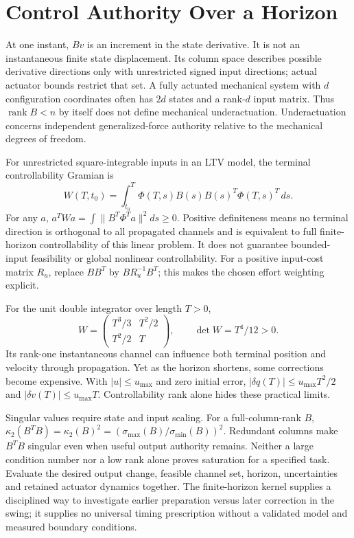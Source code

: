 \section{Control Authority Over a Horizon}

At one instant, $Bv$ is an increment in the state derivative. It is not an instantaneous finite state displacement. Its column space describes possible derivative directions only with unrestricted signed input directions; actual actuator bounds restrict that set. A fully actuated mechanical system with $d$ configuration coordinates often has $2d$ states and a rank-$d$ input matrix. Thus $\operatorname{rank}B<n$ by itself does not define mechanical underactuation. Underactuation concerns independent generalized-force authority relative to the mechanical degrees of freedom.

For unrestricted square-integrable inputs in an LTV model, the terminal controllability Gramian is
\begin{equation}
W(T,t_0)=\int_{t_0}^T\Phi(T,s)B(s)B(s)^T\Phi(T,s)^T\,ds.
\end{equation}
For any $a$, $a^TWa=\int\|B^T\Phi^Ta\|^2ds\ge0$. Positive definiteness means no terminal direction is orthogonal to all propagated channels and is equivalent to full finite-horizon controllability of this linear problem. It does not guarantee bounded-input feasibility or global nonlinear controllability. For a positive input-cost matrix $R_u$, replace $BB^T$ by $BR_u^{-1}B^T$; this makes the chosen effort weighting explicit.

For the unit double integrator over length $T>0$,
\begin{equation}
W=\begin{pmatrix}T^3/3&T^2/2\\T^2/2&T\end{pmatrix},
\qquad \det W=T^4/12>0.
\end{equation}
Its rank-one instantaneous channel can influence both terminal position and velocity through propagation. Yet as the horizon shortens, some corrections become expensive. With $|u|\le u_{\max}$ and zero initial error, $|\delta q(T)|\le u_{\max}T^2/2$ and $|\delta v(T)|\le u_{\max}T$. Controllability rank alone hides these practical limits.

Singular values require state and input scaling. For a full-column-rank $B$, $\kappa_2(B^TB)=\kappa_2(B)^2=(\sigma_{\max}(B)/\sigma_{\min}(B))^2$. Redundant columns make $B^TB$ singular even when useful output authority remains. Neither a large condition number nor a low rank alone proves saturation for a specified task. Evaluate the desired output change, feasible channel set, horizon, uncertainties and retained actuator dynamics together. The finite-horizon kernel supplies a disciplined way to investigate earlier preparation versus later correction in the swing; it supplies no universal timing prescription without a validated model and measured boundary conditions.

